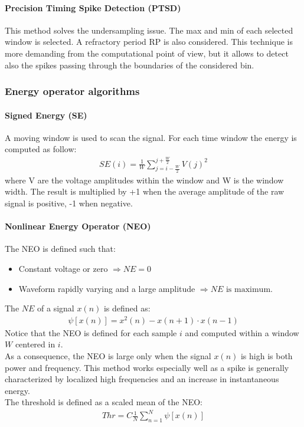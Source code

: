\paragraph{Precision Timing Spike Detection (PTSD)}
This method solves the undersampling issue. The max and min of each selected
window is selected. A refractory period RP is also considered. This technique
is more demanding from the computational point of view, but it allows to detect
also the spikes passing through the boundaries of the considered bin.
\subsubsection{Energy operator algorithms}
\paragraph{Signed Energy (SE)}
A moving window is used to scan the signal. For each time window the energy is
computed as follow:
\begin{align*}
    SE(i)=\frac{1}{W}\sum_{j=i-\frac{W}{2}}^{j+\frac{W}{2}}V(j)^2
\end{align*}
where V are the voltage amplitudes within the window and W is the window width.
The result is multiplied by +1 when the average amplitude of the raw signal is
positive, -1 when negative.
\paragraph{Nonlinear Energy Operator (NEO)}
The NEO is defined such that:
\begin{itemize}
    \item Constant voltage or zero \(\Rightarrow NE=0\)
    \item Waveform rapidly varying and a large amplitude
          \(\Rightarrow NE \text{ is maximum}\).
\end{itemize}
The \(NE\) of a signal \(x(n)\) is defined as:
\begin{align*}
    \psi[x(n)]=x^2(n)-x(n+1)\cdot x(n-1)
\end{align*}
Notice that the NEO is defined for each sample \(i\) and computed within a
window \(W\) centered in \(i\).\\
As a consequence, the NEO is large only when the signal \(x(n)\) is high is both
power and frequency. This method works especially well as a spike is generally
characterized by localized high frequencies and an increase in instantaneous
energy.\\
The threshold is defined as a scaled mean of the NEO:
\begin{align*}
    Thr=C\frac{1}{N}\sum_{n=1}^{N}\psi[x(n)]
\end{align*}
